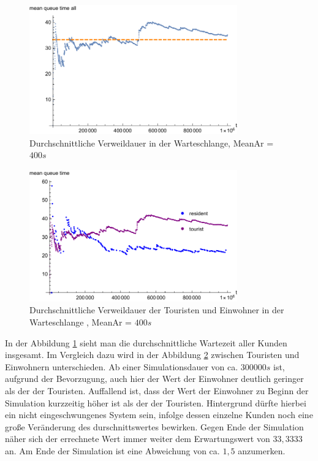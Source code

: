 \begin{figure}[htpb]
	\centering
	\includegraphics[width=0.8\textwidth]{abbildungen/1_Phone_VIP/Arrival_400_Serve_100_dur_1000000_Skip_0/MeanQueueTimeAll.pdf}
	\caption{Durchschnittliche Verweildauer in der Warteschlange, MeanAr = $400s$}
	\label{fig:MQTVIP400ALL}
\end{figure} 

\begin{figure}[htpb]
	\centering
	\includegraphics[width=0.8\textwidth]{abbildungen/1_Phone_VIP/Arrival_400_Serve_100_dur_1000000_Skip_0/MeanQueueTimeTouristAndResident.pdf}
	\caption{Durchschnittliche Verweildauer der Touristen und Einwohner in der Warteschlange , MeanAr = $400s$}
	\label{fig:MQTVIP400VGL}
\end{figure}

In der Abbildung \ref{fig:MQTVIP400ALL} sieht man die durchschnittliche Wartezeit aller Kunden insgesamt. Im Vergleich dazu wird in der Abbildung \ref{fig:MQTVIP400VGL} zwischen Touristen und Einwohnern unterschieden. Ab einer Simulationsdauer von ca. $300000s$ ist, aufgrund der Bevorzugung, auch hier der Wert der Einwohner deutlich geringer als der der Touristen. Auffallend ist, dass der Wert der Einwohner zu Beginn der Simulation kurzzeitig höher ist als der der Touristen. Hintergrund dürfte hierbei ein nicht eingeschwungenes System sein, infolge dessen einzelne Kunden noch eine große Veränderung des durschnittswertes bewirken. Gegen Ende der Simulation näher sich der errechnete Wert immer weiter dem Erwartungswert von $33,3333$ an. Am Ende der Simulation ist eine Abweichung von ca. $1,5$ anzumerken.


